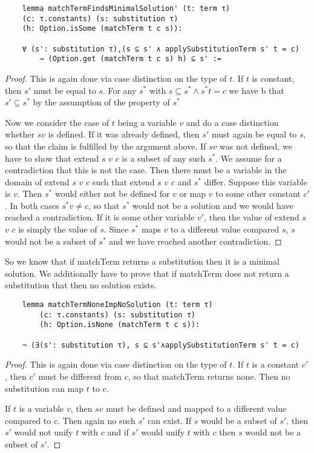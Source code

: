\begin{lstlisting}
    lemma matchTermFindsMinimalSolution' (t: term τ) 
    (c: τ.constants) (s: substitution τ) 
    (h: Option.isSome (matchTerm t c s)): 
    
    ∀ (s': substitution τ),(s ⊆ s' ∧ applySubstitutionTerm s' t = c)
        → (Option.get (matchTerm t c s) h) ⊆ s' :=
\end{lstlisting}
\begin{proof}
This is again done via case distinction on the type of $t$. If $t$ is constant, then $s'$ must be equal to $s$. For any $s^\ast$ with $s \subseteq s^\ast \land s^\ast t = c$ we have b that $s' \subseteq s^\ast$ by the assumption of the property of $s^\ast$

Now we consider the case of $t$ being a variable $v$ and do a case distinction whether $s v$ is defined. If it was already defined, then $s'$ must again be equal to $s$, so that the claim is fulfilled by the argument above.
If $s v$ was not defined, we have to show that extend $s$ $v$ $c$ is a subset of any such $s^\ast$. We assume for a contradiction that this is not the case. Then there must be a variable in the domain of extend $s$ $v$ $c$ such that extend $s$ $v$ $c$ and $s^\ast$ differ. Suppose this variable is $v$. Then $s^\ast$ would either not be defined for $v$ or map $v$ to some other constant $c'$. In both cases $s^\ast v \neq c$, so that $s^\ast$ would not be a solution and we would have reached a contradiction.
If it is some other variable $v'$, then the value of extend $s$ $v$ $c$ is simply the value of $s$. Since $s^\ast$ maps $v$ to a different value compared $s$, $s$ would not be a subset of $s^\ast$ and we have reached another contradiction.
\end{proof}

So we know that if matchTerm returns a substitution then it is a minimal solution. We additionally have to prove that if matchTerm does not return a substitution that then no solution exists.

\begin{lstlisting}
    lemma matchTermNoneImpNoSolution (t: term τ)
        (c: τ.constants) (s: substitution τ)
        (h: Option.isNone (matchTerm t c s)):
    
    ¬ (∃(s': substitution τ), s ⊆ s'∧applySubstitutionTerm s' t = c)
\end{lstlisting}
\begin{proof}
This is again done via case distinction on the type of $t$. If $t$ is a constant $c'$, then $c'$ must be different from $c$, so that matchTerm returns none. Then no substitution can map $t$ to c.

If $t$ is a variable $v$, then $s v$ must be defined and mapped to a different value compared to $c$. Then again no such $s'$ can exist. If $s$ would be a subset of $s'$, then $s'$ would not unify $t$ with $c$ and if $s'$ would unify $t$ with $c$ then $s$ would not be a subset of $s'$.
\end{proof}

